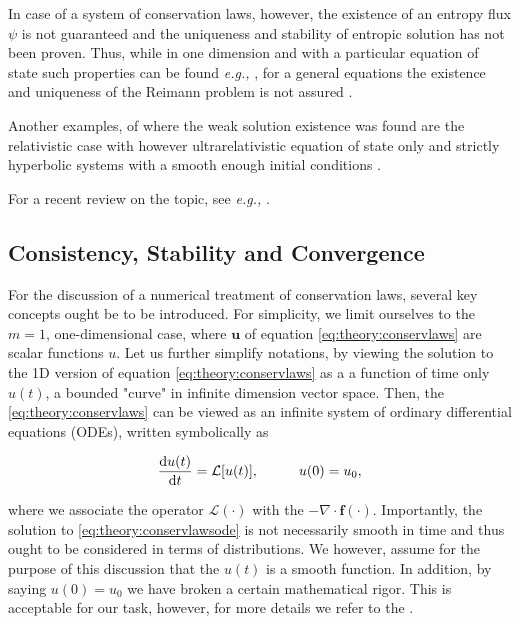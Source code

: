 \documentclass[11pt,a4paper,headinclude=true,DIV=14,BCOR=8mm,chapterprefix,listof=totoc,twoside,openright,abstracton]{scrbook}
\begin{document}
In case of a system of conservation laws, however, the existence of an entropy flux $\psi$ is not guaranteed and the uniqueness and stability of entropic solution has not been proven. 
Thus, while in one dimension and with a particular equation of state such properties can be found \textit{e.g.,} \cite{Chen:2009}, for a general equations the existence and uniqueness of the Reimann problem is not assured \cite{Curtis:1972}.

Another examples, of where the weak solution existence was found are the relativistic case \cite{Glimm:1965} with however ultrarelativistic equation of state only \cite{Smoller:1993} and strictly hyperbolic systems with a smooth enough initial conditions \cite{Lax:1957}.

For a recent review on the topic, see \textit{e.g.,} \cite{Chen:2006}. \\


\subsection{Consistency, Stability and Convergence}

For the discussion of a numerical treatment of conservation laws, several key concepts ought be to be introduced. For simplicity, we limit ourselves to the $m=1$, one-dimensional case, where $\boldsymbol{u}$ of equation \ref{eq:theory:conservlaws} are scalar functions $u$. Let us further simplify notations, by viewing the solution to the 1D version of equation \ref{eq:theory:conservlaws} as a a function of time only $u(t)$, a bounded "curve" in infinite dimension vector space. Then, the \ref{eq:theory:conservlaws} can be viewed as an infinite system of ordinary differential equations (ODEs), written symbolically as

\begin{equation}
\frac{\text{d}u(t)}{\text{d}t} = \mathcal{L}[u(t)], \hspace{10mm} u(0) = u_0,
\label{eq:theory:conservlawsode}
\end{equation}

where we associate the operator $\mathcal{L}(\cdot)$ with the $-\nabla\cdot\boldsymbol{f}(\cdot)$. 
Importantly, the solution to \ref{eq:theory:conservlawsode} is not necessarily smooth in time and thus ought to be considered in terms of distributions. We however, assume for the purpose of this discussion that the $u(t)$ is a smooth function. In addition, by saying $u(0) = u_0$ we have broken a certain mathematical rigor. This is acceptable for our task, however, for more details we refer to the \cite{Kruzkov:1970}. 
\end{document}
